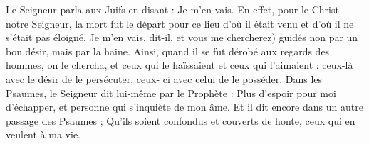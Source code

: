 Le Seigneur parla aux Juifs en disant : Je m’en vais. En effet, pour le Christ notre Seigneur, la mort fut le départ pour ce lieu d’où il était venu et d’où il ne s’était pas éloigné. Je m’en vais, dit-il, et vous me chercherez) guidés non par un bon désir, mais par la haine. Ainsi, quand il se fut dérobé aux regards des hommes, on le chercha, et ceux qui le haïssaient et ceux qui l’aimaient : ceux-là avec le désir de le persécuter, ceux- ci avec celui de le posséder. Dans les Psaumes, le Seigneur dit lui-même par le Prophète : Plus d’espoir pour moi d’échapper, et personne qui s’inquiète de mon âme. Et il dit encore dans un autre passage des Psaumes ; Qu’ils soient confondus et couverts de honte, ceux qui en veulent à ma vie.

